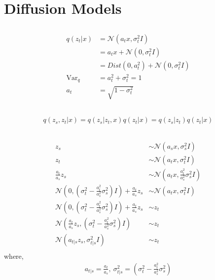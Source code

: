 \documentclass{article}
\begin{document}
\section{Diffusion Models}

\subsection{}


\begin{align*}
    q(z_t|x) 
    &= \mathcal{N}(a_tx, \sigma_t^2I) \\
    &=a_tx + \mathcal{N}(0, \sigma_t^2I) \\
    &= Dist(0, a_t^2) + \mathcal{N}(0, \sigma_t^2I)\\
    \text{Var}_q &= a_t^2 + \sigma_t^2 = 1 \\
    a_t &= \sqrt{1 - \sigma_t^2}
\end{align*}


\subsection{}
\begin{align*}
    q(z_s, z_t|x) = q(z_s|z_t, x)q(z_t|x) = q(z_s|z_t)q(z_t|x)
\end{align*}


\subsection{}
\begin{align*}
    z_s &\sim \mathcal{N}(a_sx, \sigma_s^2 I) \\
    z_t &\sim \mathcal{N}(a_tx, \sigma_t^2 I) \\
    \frac{a_t}{a_s} z_s &\sim \mathcal{N}(a_tx, \frac{a_t^2}{a_s^2}\sigma_s^2 I) \\
    \mathcal{N}(0, (\sigma_t^2 - \frac{a_t^2}{a_s^2}\sigma_s^2)I) + \frac{a_t}{a_s} z_s &\sim \mathcal{N}(a_tx, \sigma_t^2I) \\
    \mathcal{N}(0, (\sigma_t^2 - \frac{a_t^2}{a_s^2}\sigma_s^2)I) + \frac{a_t}{a_s} z_s &\sim z_t \\
    \mathcal{N}(\frac{a_t}{a_s} z_s, (\sigma_t^2 - \frac{a_t^2}{a_s^2}\sigma_s^2)I) &\sim z_t \\
    \mathcal{N}(a_{t|s}z_s, \sigma_{t|s}^2I) &\sim z_t \\
\end{align*}
where,
\begin{align*}
    a_{t|s} = \frac{a_t}{a_s}, \ 
    \sigma_{t|s}^2 = (\sigma_t^2 - \frac{a_t^2}{a_s^2}\sigma_s^2)
\end{align*}
\end{document}
